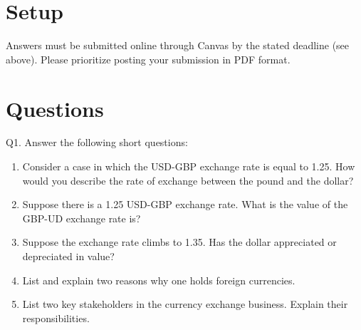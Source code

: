 \documentclass[12pt]{article}
\begin{document}
\singlespacing


\bigskip

\doublespacing



\section*{Setup}

\noindent 
Answers must be submitted online through Canvas by the stated deadline (see above).
Please prioritize posting your submission in PDF format.

\section*{Questions}

\noindent Q1. Answer the following short questions:

\begin{enumerate}[1)]
	
	\item Consider a case in which the USD-GBP exchange rate is equal to 1.25. How would you describe the rate of exchange between the pound and the dollar? 
	
	\vspace{2in}
	
	\item Suppose there is a 1.25 USD-GBP exchange rate. What is the value of the GBP-UD exchange rate is?
	
	\vspace{2in}
	
	\newpage
	
	\item Suppose the exchange rate climbs to 1.35. Has the dollar appreciated or depreciated in value?
	
	\vspace{2.5in}
	
	\item List and explain two reasons why one holds foreign currencies. 
	
	\vspace{2.5in}
	
	\item List two key stakeholders in the currency exchange business. Explain their responsibilities.
	
	\vspace{1in}
	
\end{enumerate}
\end{document}
